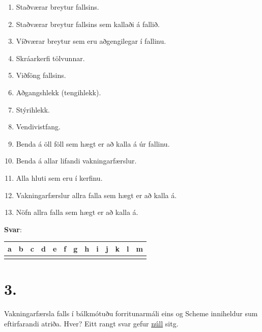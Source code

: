 \documentclass{article}
\begin{document}
\begin{enumerate}[label = \alph*)]
    \item Staðværar breytur fallsins.
    \item Staðværar breytur fallsins sem kallaði á fallið.
    \item Víðværar breytur sem eru aðgengilegar í fallinu.
    \item Skráarkerfi tölvunnar.
    \item Viðföng fallsins.
    \item Aðgangshlekk (tengihlekk).
    \item Stýrihlekk.
    \item Vendivistfang.
    \item Benda á öll föll sem hægt er að kalla á úr fallinu.
    \item Benda á allar lifandi vakningarfærslur.
    \item Alla hluti sem eru í kerfinu.
    \item Vakningarfærslur allra falla sem hægt er að kalla á.
    \item Nöfn allra falla sem hægt er að kalla á.
\end{enumerate}

\textbf{Svar}:

\begin{tabularx}{\textwidth}{ |X|X|X|X|X|X|X|X|X|X|X|X|X|}
    \hline
    \textbf{a}  & \textbf{b}  & \textbf{c}  & \textbf{d}  & \textbf{e}  & \textbf{f}  & \textbf{g}  & \textbf{h}  & \textbf{i}  & \textbf{j}  & \textbf{k}  & \textbf{l} & \textbf{m}   \\ \hline
     & & & & & & & & & & & & \\ \hline
 \end{tabularx}

 \newpage

 \section{3.}
    Vakningarfærsla falls í bálkmótuðu forritunarmáli eins og Scheme inniheldur sum eftirfarandi atriða. Hver? Eitt rangt svar gefur \underline{núll} sitg.
\end{document}
